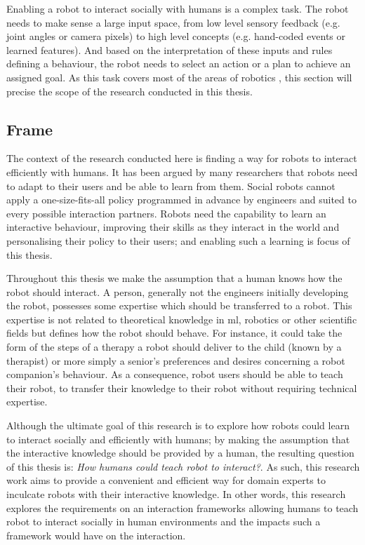 

Enabling a robot to interact socially with humans is a complex task. The robot needs to make sense a large input space, from low level sensory feedback (e.g. joint angles or camera pixels) to high level concepts (e.g. hand-coded events or learned features). And based on the interpretation of these inputs and rules defining a behaviour, the robot needs to select an action or a plan to achieve an assigned goal. As this task covers most of the areas of robotics \citep{fong2003survey}, this section will precise the scope of the research conducted in this thesis.

\subsection{Frame}

The context of the research conducted here is finding a way for robots to interact efficiently with humans. It has been argued by many researchers  \citep{dautenhahn2004robots,billard2008robot} that robots need to adapt to their users and be able to learn from them. Social robots cannot apply a one-size-fits-all policy programmed in advance by engineers and suited to every possible interaction partners. Robots need the capability to learn an interactive behaviour, improving their skills as they interact in the world and personalising their policy to their users; and enabling such a learning is focus of this thesis.

Throughout this thesis we make the assumption that a human knows how the robot should interact. A person, generally not the engineers initially developing the robot, possesses some expertise which should be transferred to a robot. This expertise is not related to theoretical knowledge in \gls{ml}, robotics or other scientific fields but defines how the robot should behave. For instance,  it could take the form of the steps of a therapy a robot should deliver to the child (known by a therapist) or more simply a senior's preferences and desires concerning a robot companion's behaviour. As a consequence, robot users should be able to teach their robot, to transfer their knowledge to their robot without requiring technical expertise.

Although the ultimate goal of this research is to explore how robots could learn to interact socially and efficiently with humans; by making the assumption that the interactive knowledge should be provided by a human, the resulting question of this thesis is: \emph{How humans could teach robot to interact?}. As such, this research work aims to provide a convenient and efficient way for domain experts to inculcate robots with their interactive knowledge. In other words, this research explores the requirements on an interaction frameworks allowing humans to teach robot to interact socially in human environments and the impacts such a framework would have on the interaction.

